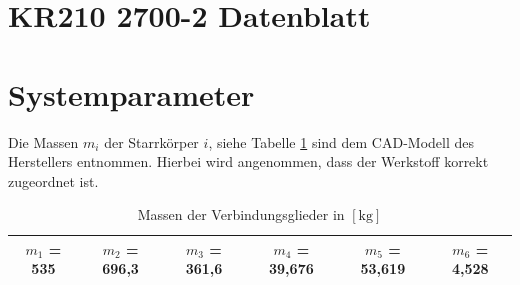 %
%
%
%
%
\setcounter{chapter}{3}
\setcounter{section}{0}
\setcounter{table}{0}
\setcounter{figure}{0}
%
%
%

\section{KR210 2700-2 Datenblatt}
\label{add:datenblatt}

\setcounter{section}{1}
\section{Systemparameter}
\label{add:Systemparameterdef}
Die Massen $m_i$ der Starrkörper $i$, siehe Tabelle \ref{tab:masse} sind dem CAD-Modell des Herstellers entnommen. Hierbei wird angenommen, dass der Werkstoff korrekt zugeordnet ist. 

\begin{table}[hptb]
	\centering
	\caption{Massen der Verbindungsglieder in $\left[\mathrm{kg}\right]$}
	\label{tab:masse}
	\begin{tabular}{|c|c|c|c|c|c|}
		\hline
		$m_1$ = 535 & $m_2$ = 696,3   &$m_3$ = 361,6   & $m_4$ = 39,676 &$m_5$ = 53,619   &$m_6$ = 4,528  \\
		\hline
	\end{tabular}
\end{table}

